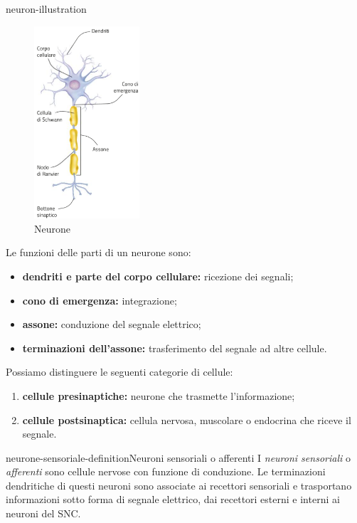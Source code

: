 \documentclass[preview]{standalone}
\begin{document}
\begin{snippet}{neuron-illustration}
    \setlength{\intextsep}{0pt}%
    \begin{figure}
        \includegraphics[width=0.35\textwidth]{./resources/neuron.png}
        \caption{Neurone}
        \vspace{-1cm}
    \end{figure}

    Le funzioni delle parti di un neurone sono:
    \begin{itemize}
        \item \textbf{dendriti e parte del corpo cellulare:} ricezione dei segnali;
        \item \textbf{cono di emergenza:} integrazione;
        \item \textbf{assone:} conduzione del segnale elettrico;
        \item \textbf{terminazioni dell'assone:} trasferimento del segnale ad altre cellule.
    \end{itemize}

    Possiamo distinguere le seguenti categorie di cellule:
    \begin{enumerate}
        \item \textbf{cellule presinaptiche:} neurone che trasmette l'informazione;
        \item\textbf{cellule postsinaptica:} cellula nervosa, muscolare o endocrina che riceve il segnale.
    \end{enumerate}

    \wrapfill
\end{snippet}

\begin{snippetdefinition}{neurone-sensoriale-definition}{Neuroni sensoriali o afferenti}
    I \textit{neuroni sensoriali} o \textit{afferenti} sono
    cellule nervose con funzione di conduzione. Le terminazioni dendritiche di questi neuroni
    sono associate ai recettori sensoriali e trasportano informazioni sotto forma di segnale
    elettrico, dai recettori esterni e interni ai neuroni del SNC.
\end{snippetdefinition}
\end{document}
